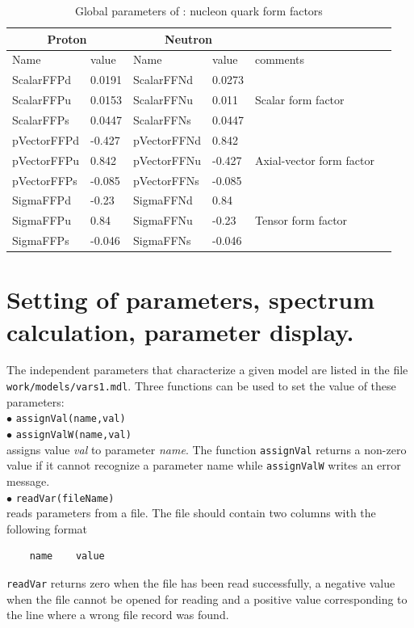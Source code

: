 \documentclass[12pt,a4paper]{article}
\begin{document}
\begin{table}[]
 \caption{Global parameters of \micro :  nucleon quark form factors}
 \label{FFTab}
\begin{center}
\begin{tabular}{|l|l|l|l|l|l|}
\hline
 \multicolumn{2}{|c|}{Proton}& \multicolumn{2}{|c|}{Neutron} & \\ \hline
  Name      &  value       &  Name      &  value     &  comments \\  \hline
ScalarFFPd  &  0.0191     &ScalarFFNd  &  0.0273  & \\
ScalarFFPu  &  0.0153     &ScalarFFNu  &  0.011 & Scalar form factor \\
ScalarFFPs  &  0.0447      &ScalarFFNs  &  0.0447   & \\
\hline
pVectorFFPd &  -0.427      &pVectorFFNd &  0.842    & \\
pVectorFFPu &   0.842      &pVectorFFNu &  -0.427   & Axial-vector form factor\\
pVectorFFPs &  -0.085      &pVectorFFNs &  -0.085   & \\
\hline
SigmaFFPd   &  -0.23       &SigmaFFNd   &  0.84     & \\
SigmaFFPu   &   0.84       &SigmaFFNu   &  -0.23    & Tensor form factor\\
SigmaFFPs   &   -0.046     &SigmaFFNs   &  -0.046   & \\
\hline
\end{tabular}
\end{center}
\end{table}

\section{Setting of parameters, spectrum calculation, parameter display.}
\label{setting_parameters}
The independent parameters that characterize a given model are listed in 
the file \\
\noindent
\verb|work/models/vars1.mdl|. Three functions can be used to set the
value of these parameters:\\

\noindent
$\bullet$ \verb|assignVal(name,val)|\\
$\bullet$ \verb|assignValW(name,val)|\\
assigns value {\it val} to parameter {\it name}. The function  \verb|assignVal| returns a non-zero
value  if it
cannot recognize  a parameter name while \verb|assignValW| writes an error message.  \\
$\bullet$ \verb|readVar(fileName)|\\
reads parameters from a file. The file  should contain two columns with the 
 following  format 
\begin{verbatim}
    name    value
\end{verbatim}
\verb|readVar| returns zero when
the file has been read successfully, a negative value when the
file cannot be opened for reading and  a positive  value 
corresponding to the line where a wrong file record was found.
\end{document}
